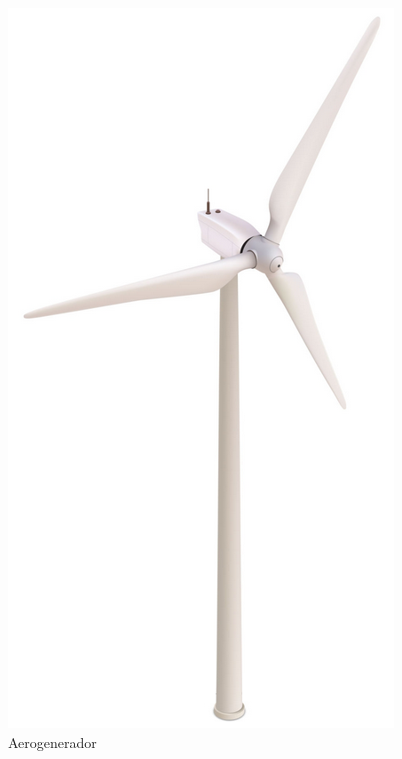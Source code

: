 \documentclass[spanish,a4paper,12pt]{article}
\begin{document}
\begin{figure}[hb]
\centering
\begin{minipage}[b]{0.4\linewidth}
    \centering
\includegraphics[width=0.9\linewidth]{molino.png}
\caption{Aerogenerador}
\label{fig:Aerogenerador}
\end{minipage}
\hfil
\begin{minipage}[b]{0.35\linewidth}
\centering

\end{minipage}
\end{figure}
\end{document}
